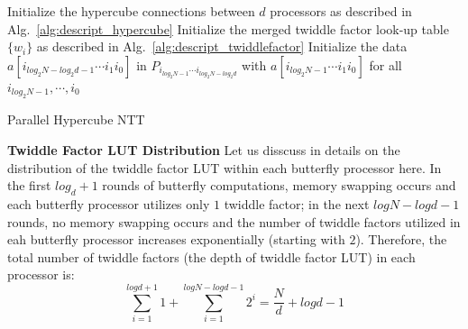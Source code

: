 \documentclass[submission]{iacrtrans}
\theoremstyle{plain}
\begin{document}
\begin{algorithm}[!tbh]
 \DontPrintSemicolon %
    Initialize the hypercube connections between $d$ processors as described in Alg.~\ref{alg:descript_hypercube}\;
    Initialize the merged twiddle factor look-up table $\{w_i\}$ as described in Alg.~\ref{alg:descript_twiddlefactor}\;
    Initialize the data $a[i_{log_2N-log_2d-1}\cdots i_1i_0]$ in $P_{i_{log_2N-1}\cdots i_{log_2N-log_2d}}$ with $a[i_{log_2N-1}\cdots i_1i_0]$ for all $i_{log_2N-1},\cdots,i_0$\;
 \caption{Parallel Hypercube NTT}\label{alg:descript_hypercube_ntt}
\end{algorithm}

\textbf{Twiddle Factor LUT Distribution} Let us disscuss in details on the distribution of the twiddle factor LUT within each butterfly processor here. In the first $log_d+1$ rounds of butterfly computations, memory swapping occurs and each butterfly processor utilizes only $1$ twiddle factor; in the next $logN-logd-1$ rounds, no memory swapping occurs and the number of twiddle factors utilized in eah butterfly processor increases exponentially (starting with $2$). Therefore, the total number of twiddle factors (the depth of twiddle factor LUT) in each processor is:
\[
    \sum_{i=1}^{logd+1}1 + \sum_{i=1}^{logN-logd-1}2^i=\frac{N}{d}+logd-1
\]
\end{document}
